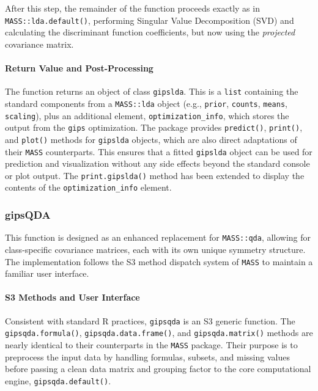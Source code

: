\documentclass[a4paper,11pt,twoside]{report}
\theoremstyle{definition}
\begin{document}
After this step, the remainder of the function proceeds exactly as in \texttt{MASS::lda.default()}, performing Singular Value Decomposition (SVD) and calculating the discriminant function coefficients, but now using the \textit{projected} covariance matrix.

\paragraph{Return Value and Post-Processing}
The function returns an object of class \texttt{gipslda}. This is a \texttt{list} containing the standard components from a \texttt{MASS::lda} object (e.g., \texttt{prior}, \texttt{counts}, \texttt{means}, \texttt{scaling}), plus an additional element, \texttt{optimization\_info}, which stores the output from the \texttt{gips} optimization. The package provides \texttt{predict()}, \texttt{print()}, and \texttt{plot()} methods for \texttt{gipslda} objects, which are also direct adaptations of their \texttt{MASS} counterparts. This ensures that a fitted \texttt{gipslda} object can be used for prediction and visualization without any side effects beyond the standard console or plot output. The \texttt{print.gipslda()} method has been extended to display the contents of the \texttt{optimization\_info} element.

\subsubsection{gipsQDA}
This function is designed as an enhanced replacement for \texttt{MASS::qda}, allowing for class-specific covariance matrices, each with its own unique symmetry structure. The implementation follows the S3 method dispatch system of \texttt{MASS} to maintain a familiar user interface.

\paragraph{S3 Methods and User Interface}
Consistent with standard R practices, \texttt{gipsqda} is an S3 generic function. The \texttt{gipsqda.formula()}, \texttt{gipsqda.data.frame()}, and \texttt{gipsqda.matrix()} methods are nearly identical to their counterparts in the \texttt{MASS} package. Their purpose is to preprocess the input data by handling formulas, subsets, and missing values before passing a clean data matrix and grouping factor to the core computational engine, \texttt{gipsqda.default()}.
\end{document}
